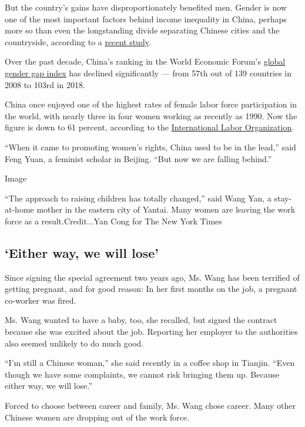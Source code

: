 But the country's gains have disproportionately benefited men. Gender is
now one of the most important factors behind income inequality in China,
perhaps more so than even the longstanding divide separating Chinese
cities and the countryside, according to a
\href{https://onlinelibrary.wiley.com/doi/10.1111/cwe.12266}{recent
study}.

Over the past decade, China's ranking in the World Economic Forum's
\href{http://www3.weforum.org/docs/WEF_GGGR_2018.pdf}{global gender gap
index} has declined significantly --- from 57th out of 139 countries in
2008 to 103rd in 2018.

China once enjoyed one of the highest rates of female labor force
participation in the world, with nearly three in four women working as
recently as 1990. Now the figure is down to 61 percent, according to the
\href{https://data.worldbank.org/indicator/sl.tlf.cact.fe.zs}{International
Labor Organization}.

``When it came to promoting women's rights, China used to be in the
lead,'' said Feng Yuan, a feminist scholar in Beijing. ``But now we are
falling behind.''

Image

``The approach to raising children has totally changed,'' said Wang Yan,
a stay-at-home mother in the eastern city of Yantai. Many women are
leaving the work force as a result.Credit...Yan Cong for The New York
Times

\hypertarget{either-way-we-will-lose}{%
\subsection{`Either way, we will lose'}\label{either-way-we-will-lose}}

Since signing the special agreement two years ago, Ms. Wang has been
terrified of getting pregnant, and for good reason: In her first months
on the job, a pregnant co-worker was fired.

Ms. Wang wanted to have a baby, too, she recalled, but signed the
contract because she was excited about the job. Reporting her employer
to the authorities also seemed unlikely to do much good.

``I'm still a Chinese woman,'' she said recently in a coffee shop in
Tianjin. ``Even though we have some complaints, we cannot risk bringing
them up. Because either way, we will lose.''

Forced to choose between career and family, Ms. Wang chose career. Many
other Chinese women are dropping out of the work force.


